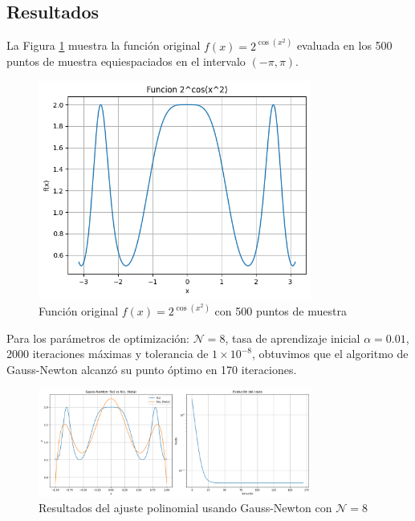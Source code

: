 \documentclass{article}
\begin{document}
\subsection{Resultados}
\setcounter{equation}{0}

La Figura \ref{fig:fx} muestra la función original $f(x) = 2^{\cos(x^2)}$ evaluada en los 500 puntos de muestra equiespaciados en el intervalo $(-\pi, \pi)$.

\begin{figure}[H]
    \centering
    \includegraphics[width=0.8\textwidth]{images/1_fx.png}
    \caption{Función original $f(x) = 2^{\cos(x^2)}$ con 500 puntos de muestra}
    \label{fig:fx}
\end{figure}

Para los parámetros de optimización: $\mathcal{N}=8$, tasa de aprendizaje inicial $\alpha = 0.01$, 2000 iteraciones máximas y tolerancia de $1 \times 10^{-8}$, obtuvimos que el algoritmo de Gauss-Newton alcanzó su punto óptimo en 170 iteraciones.

\begin{figure}[H]
    \centering
    \includegraphics[width=0.8\textwidth]{images/1_gauss_newton_N8.png}
    \caption{Resultados del ajuste polinomial usando Gauss-Newton con $\mathcal{N}=8$}
    \label{fig:gauss_newton_results}
\end{figure}
\end{document}
